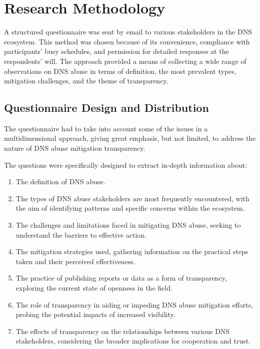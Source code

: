 \chapter{Research Methodology}



A structured questionnaire was sent by email to various stakeholders in the DNS ecosystem. This method was chosen because of its convenience, compliance with participants' busy schedules, and permission for detailed responses at the respondents' will. The approach provided a means of collecting a wide range of observations on DNS abuse in terms of definition, the most prevalent types, mitigation challenges, and the theme of transparency. 



\section{Questionnaire Design and Distribution} 

The questionnaire had to take into account some of the issues in a multidimensional approach, giving great emphasis, but not limited, to address the nature of DNS abuse mitigation transparency.

The questions were specifically designed to extract in-depth information about:


 \begin{enumerate}
 \item The definition of DNS abuse. 
 
  \item The types of DNS abuse stakeholders are most frequently encountered, with the aim of identifying patterns and specific concerns within the ecosystem.
  
  \item The challenges and limitations faced in mitigating DNS abuse, seeking to understand the barriers to effective action.
  
  \item The mitigation strategies used, gathering information on the practical steps taken and their perceived effectiveness.
  
  \item The practice of publishing reports or data as a form of transparency, exploring the current state of openness in the field.
  
  \item The role of transparency in aiding or impeding DNS abuse mitigation efforts, probing the potential impacts of increased visibility.
  
  \item  The effects of transparency on the relationships between various DNS stakeholders, considering the broader implications for cooperation and trust.
\end{enumerate}


